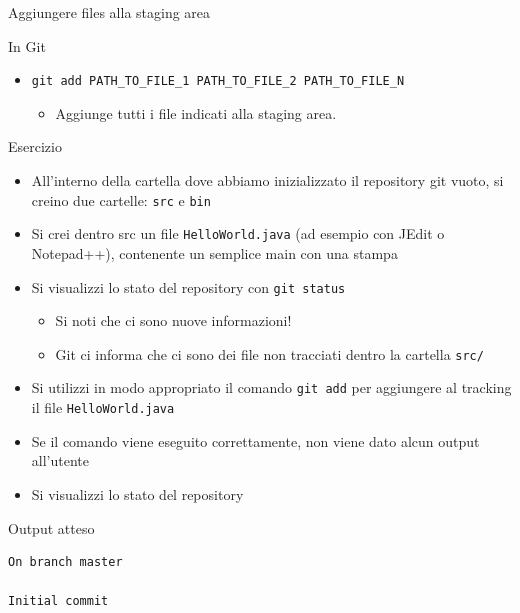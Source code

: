 \documentclass[presentation]{beamer}
\begin{document}
\begin{frame}{Aggiungere files alla staging area}
\begin{block}{In Git}
\begin{itemize}
\begin{itemize}
del repository.
				\item Il file deve essere cambiato rispetto allo stato precedente (perché nuovo, 
modificato, o cancellato)
				\item Il file può essere un file che esisteva ma è stato cancellato!
				\item In questo caso, viene registrata nella staging area la cancellazione
			\end{itemize}
			\item \texttt{git add PATH\_TO\_FILE\_1 PATH\_TO\_FILE\_2 PATH\_TO\_FILE\_N}
			\begin{itemize}
				\item Aggiunge tutti i file indicati alla staging area.
			\end{itemize}
		\end{itemize}
	\end{block}
	\begin{block}{Esercizio}	
		\begin{itemize}
			\item All'interno della cartella dove abbiamo inizializzato il repository git vuoto, si 
creino due cartelle: \texttt{src} e \texttt{bin}
			\item Si crei dentro src un file \texttt{HelloWorld.java} (ad esempio con JEdit o 
Notepad++), contenente un semplice main con una stampa
			\item Si visualizzi lo stato del repository con \texttt{git status}
			\begin{itemize}
				\item Si noti che ci sono nuove informazioni!
				\item Git ci informa che ci sono dei file non tracciati dentro la cartella 
\texttt{src/}
			\end{itemize}
			\item Si utilizzi in modo appropriato il comando \texttt{git add} per aggiungere al 
tracking il file \texttt{HelloWorld.java}
			\item Se il comando viene eseguito correttamente, non viene dato alcun output all'utente
			\item Si visualizzi lo stato del repository
		\end{itemize}
	\end{block}
	\begin{block}{Output atteso}
		\begin{Verbatim}[fontsize=\scriptsize]
On branch master

Initial commit


\end{Verbatim}
\end{block}
\end{frame}
\end{document}
